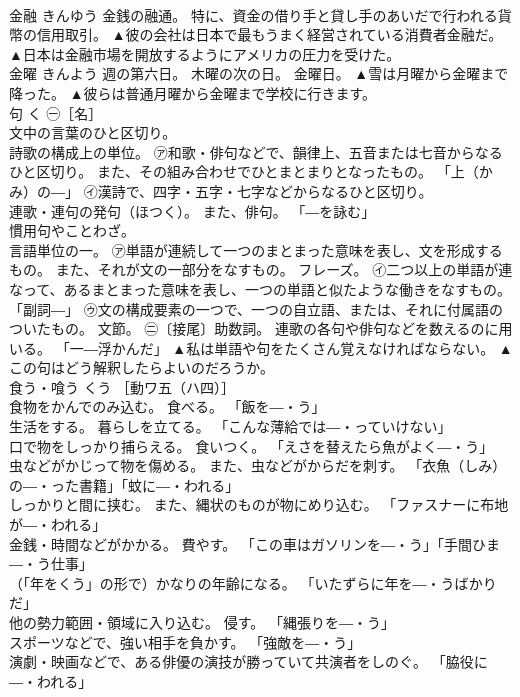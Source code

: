 \documentclass[8pt]{extreport}
\begin{document}
\begin{CJK}{UTF8}{min}
\\	金融	きんゆう	金銭の融通。 特に、資金の借り手と貸し手のあいだで行われる貨幣の信用取引。	▲彼の会社は日本で最もうまく経営されている消費者金融だ。 ▲日本は金融市場を開放するようにアメリカの圧力を受けた。
\\	金曜	きんよう	週の第六日。 木曜の次の日。 金曜日。	▲雪は月曜から金曜まで降った。 ▲彼らは普通月曜から金曜まで学校に行きます。
\\	句	く	㊀［名］ 
\\	文中の言葉のひと区切り。 
\\	詩歌の構成上の単位。 ㋐和歌・俳句などで、韻律上、五音または七音からなるひと区切り。 また、その組み合わせでひとまとまりとなったもの。 「上（かみ）の―」 ㋑漢詩で、四字・五字・七字などからなるひと区切り。 
\\	連歌・連句の発句（ほつく）。 また、俳句。 「―を詠む」 
\\	慣用句やことわざ。 
\\	言語単位の一。 ㋐単語が連続して一つのまとまった意味を表し、文を形成するもの。 また、それが文の一部分をなすもの。 フレーズ。 ㋑二つ以上の単語が連なって、あるまとまった意味を表し、一つの単語と似たような働きをなすもの。 「副詞―」 ㋒文の構成要素の一つで、一つの自立語、または、それに付属語のついたもの。 文節。 ㊁〔接尾〕助数詞。 連歌の各句や俳句などを数えるのに用いる。 「一―浮かんだ」	▲私は単語や句をたくさん覚えなければならない。 ▲この句はどう解釈したらよいのだろうか。
\\	食う・喰う	くう	［動ワ五（ハ四）］ 
\\	食物をかんでのみ込む。 食べる。 「飯を―・う」 
\\	生活をする。 暮らしを立てる。 「こんな薄給では―・っていけない」 
\\	口で物をしっかり捕らえる。 食いつく。 「えさを替えたら魚がよく―・う」 
\\	虫などがかじって物を傷める。 また、虫などがからだを刺す。 「衣魚（しみ）の―・った書籍」「蚊に―・われる」 
\\	しっかりと間に挟む。 また、縄状のものが物にめり込む。 「ファスナーに布地が―・われる」 
\\	金銭・時間などがかかる。 費やす。 「この車はガソリンを―・う」「手間ひま―・う仕事」 
\\	（「年をくう」の形で）かなりの年齢になる。 「いたずらに年を―・うばかりだ」 
\\	他の勢力範囲・領域に入り込む。 侵す。 「縄張りを―・う」 
\\	スポーツなどで、強い相手を負かす。 「強敵を―・う」 
\\	演劇・映画などで、ある俳優の演技が勝っていて共演者をしのぐ。 「脇役に―・われる」 

\end{CJK}
\end{document}
